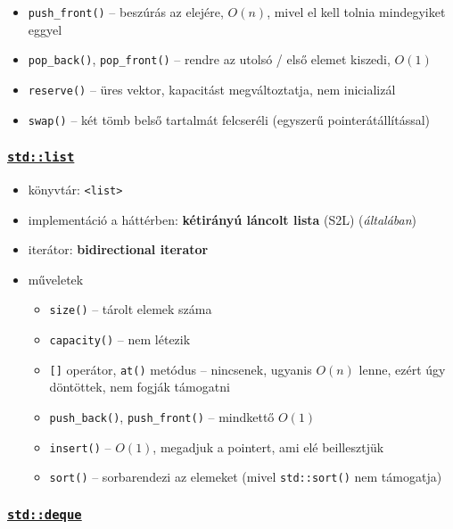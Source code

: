 \documentclass[a4paper, 11pt, oneside]{book}
\begin{document}
\begin{itemize}
\begin{itemize}
\begin{itemize}
		\end{itemize}
	\item \verb*|push_front()| -- beszúrás az elejére, $O(n)$, mivel el kell tolnia mindegyiket eggyel
	\item \verb*|pop_back()|, \verb*|pop_front()| -- rendre az utolsó / első elemet kiszedi, $O(1)$
	\item \verb*|reserve()| -- üres vektor, kapacitást megváltoztatja, nem inicializál
	\item \verb*|swap()| -- két tömb belső tartalmát felcseréli (egyszerű pointerátállítással)
	\end{itemize}
\end{itemize}

\clearpage

\subsubsection{\underline{\texttt{std::list}}}

\begin{itemize}
	\item könyvtár: \verb*|<list>|
	\item implementáció a háttérben: \textbf{kétirányú láncolt lista} (S2L) (\textit{általában})
	\item iterátor: \textbf{bidirectional iterator}
	\item műveletek
	\begin{itemize}
		\item \texttt{size()} -- tárolt elemek száma
		\item \texttt{capacity()} -- nem létezik
		\item \texttt{[]} operátor, \verb*|at()| metódus -- nincsenek, ugyanis $O(n)$ lenne, ezért úgy döntöttek, nem fogják támogatni
		\item \verb*|push_back()|, \verb*|push_front()| -- mindkettő $O(1)$
		\item \verb*|insert()| -- $O(1)$, megadjuk a pointert, ami elé beillesztjük
		\item \verb*|sort()| -- sorbarendezi az elemeket (mivel \verb*|std::sort()| nem támogatja)
	\end{itemize}
\end{itemize}

\subsubsection{\underline{\texttt{std::deque}}}
\end{document}
